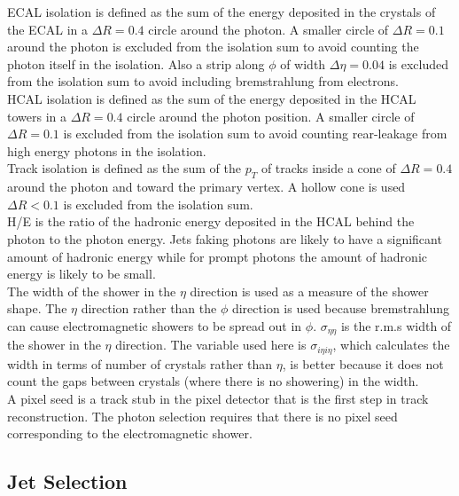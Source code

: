ECAL isolation is defined as the sum of the energy deposited in the crystals of 
the ECAL in a $\Delta R = 0.4$ circle around the photon. A smaller circle of 
$\Delta R = 0.1$ around the photon is excluded from the isolation sum to avoid 
counting the photon itself in the isolation. Also a strip along $\phi$ of width 
$\Delta \eta = 0.04$ is excluded from the isolation sum to avoid including 
bremstrahlung from electrons. \\

HCAL isolation is defined as the sum of the energy deposited in the HCAL towers
in a $\Delta R = 0.4$ circle around the photon position. A smaller circle of 
$\Delta R = 0.1$ is excluded from the isolation sum to avoid counting 
rear-leakage from high energy photons in the isolation. \\ 

Track isolation is defined as the sum of the $p_{T}$ of tracks inside a cone of
$\Delta R = 0.4$ around the photon and toward the primary vertex. A hollow cone 
is used $\Delta R < 0.1$ is excluded from the isolation sum. \\

H/E is the ratio of the hadronic energy deposited in the HCAL behind the photon
to the photon energy. Jets faking photons are likely to have a significant 
amount of hadronic energy while for prompt photons the amount of hadronic energy
is likely to be small. \\

The width of the shower in the $\eta$ direction is used as a measure of the
shower shape. The $\eta$ direction rather than the $\phi$ direction is used 
because bremstrahlung can cause electromagnetic showers to be spread out in 
$\phi$. $\sigma_{\eta\eta}$ is the r.m.s width of the shower in the $\eta$ 
direction. The variable used here is $\sigma_{i\eta i\eta}$, which calculates 
the width in terms of number of crystals rather than $\eta$, is better because 
it does not count the gaps between crystals (where there is no showering) in the
width. \\

A pixel seed is a track stub in the pixel detector that is the first step in
track reconstruction. The photon selection requires that there is no pixel seed
corresponding to the electromagnetic shower.

\subsection{Jet Selection}

